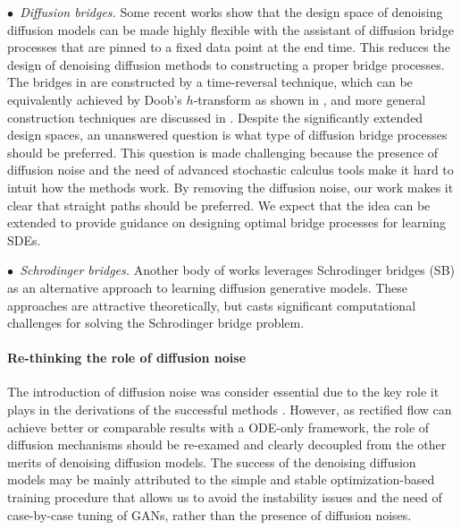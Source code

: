 \documentclass[11pt]{article}
\begin{document}
\emph{$\bullet$~Diffusion bridges.}
Some recent works \cite{peluchetti2021non, bridge} show that the design space of denoising  diffusion models can be made highly  flexible with the assistant of diffusion bridge processes that are pinned to a fixed data point at the end time. This reduces the design of denoising diffusion methods to 
constructing a proper bridge processes. 
The bridges in 
\citet{song2020score} are  
constructed by a time-reversal technique, which can be equivalently achieved by Doob's $h$-transform as shown in \cite{peluchetti2021non, bridge}, 
and more general construction techniques are discussed in \cite{bridge, geobridge}.  
Despite the significantly extended  design spaces, an unanswered question %
is 
what type of diffusion bridge processes should be preferred. 
This question is made challenging because the presence of diffusion noise and the need of advanced stochastic calculus tools  make it hard to intuit  how the methods work.
By removing the diffusion noise, 
our work makes it clear that straight paths should be preferred. We expect that the idea can be extended to provide guidance on designing optimal bridge processes for learning SDEs. 

\emph{$\bullet$~Schrodinger bridges.} 
Another body of works  \citep{wang2021deep, de2021diffusion, chen2021likelihood, vargas2021solving}  
leverages  
Schrodinger bridges (SB) as an alternative approach to learning diffusion generative models. These approaches are attractive theoretically, but casts significant  
computational challenges for solving the Schrodinger bridge problem.    








\paragraph{Re-thinking the role of diffusion noise}
The introduction of diffusion noise 
was consider essential due to the key role  
it plays in the derivations of the successful methods \citep{song2020score, ho2020denoising}. 
However, 
as rectified flow 
can achieve better or comparable results with a ODE-only framework, 
the role of diffusion mechanisms 
should be re-examed and clearly decoupled from the other merits of denoising diffusion models. 
The success of  
the denoising diffusion models may be 
 mainly attributed to the simple and stable  optimization-based training procedure 
that allows us to avoid the instability issues 
and the need of case-by-case tuning of GANs, rather than the presence of diffusion noises. 
\end{document}
